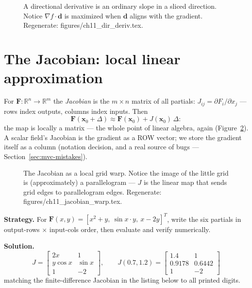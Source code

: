 \begin{figure}[htbp]
\centering

\caption{A directional derivative is an ordinary slope in a sliced
direction. Notice $\nabla f\cdot\mathbf d$ is maximized when $\mathbf d$
aligns with the gradient. Regenerate:
\ttfamily figures/ch11\_dir\_deriv.tex.}
\label{fig:dirderiv}
\end{figure}

\section{The Jacobian: local linear approximation}\label{sec:mvc-jacobian}

For $\mathbf F:\mathbb R^{n}\to\mathbb R^{m}$ the
\emph{Jacobian} is the $m\times n$ matrix of all
partials: $J_{ij}=\partial F_i/\partial x_j$ --- rows index outputs,
columns index inputs. Then
\[
\mathbf F(\mathbf x_0+\Delta)\approx\mathbf F(\mathbf x_0)+J(\mathbf
x_0)\,\Delta:
\]
the map is locally a matrix --- the whole point of linear algebra, again
(Figure~\ref{fig:jacwarp}). A scalar field's Jacobian is the gradient as
a ROW vector; we store the gradient itself as a column (notation
decision, and a real source of bugs --- Section~\ref{sec:mvc-mistakes}).

\begin{figure}[htbp]
\centering

\caption{The Jacobian as a local grid warp. Notice the image of the
little grid is (approximately) a parallelogram --- $J$ is the linear map
that sends grid edges to parallelogram edges. Regenerate:
\ttfamily figures/ch11\_jacobian\_warp.tex.}
\label{fig:jacwarp}
\end{figure}

\begin{example}\label{ex:jac}
\textbf{Strategy.} For
$\mathbf F(x,y)=[x^{2}+y,\ \sin x\cdot y,\ x-2y]^{T}$, write the six
partials in output-rows $\times$ input-cols order, then evaluate and
verify numerically.

\textbf{Solution.}
\[
J=\begin{bmatrix}2x & 1\\ y\cos x & \sin x\\ 1 & -2\end{bmatrix},
\qquad
J(0.7,1.2)=\begin{bmatrix}1.4&1\\0.9178&0.6442\\1&-2\end{bmatrix}
\]
matching the finite-difference Jacobian in the listing below to all
printed digits.
\end{example}

